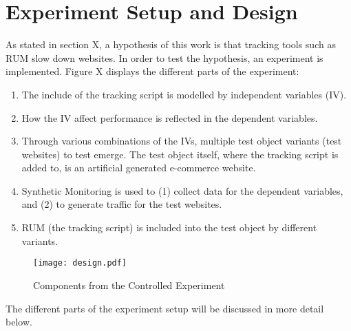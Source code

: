 






\section{Experiment Setup and Design}


As stated in section X, a hypothesis of this work is that tracking tools such as RUM slow down websites.
In order to test the hypothesis, an experiment is implemented.
Figure X displays the different parts of the experiment:

\begin{enumerate}[label=(\alph*)]
\item The include of the tracking script is modelled by independent variables (IV).
\item How the IV affect performance is reflected in the dependent variables.
\item Through various combinations of the IVs, multiple test object variants (test websites) to test emerge. The test object itself, where the tracking script is added to, is an artificial generated e-commerce website.
\item Synthetic Monitoring is used to (1) collect data for the dependent variables, and (2) to generate traffic for the test websites.
\item RUM (the tracking script) is included into the test object by different variants. 
\end{enumerate}


\begin{figure}[h!]
\begin{center}
\texttt{[image: design.pdf]}
\caption{Components from the Controlled Experiment}
\label{figure:design_setup}
\end{center}
\end{figure}

The different parts of the experiment setup will be discussed in more detail below.


